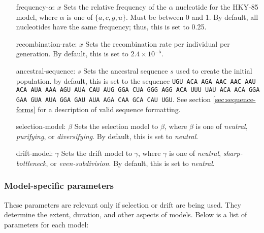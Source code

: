\documentclass{article}
\begin{document}
\begin{enumerate}
          \item[frequency-$\alpha$: $x$]
          Sets the relative frequency of the $\alpha$ nucleotide for the HKY-85
          model, where $\alpha$ is one of $\{a, c, g, u\}$. Must be between 0
          and 1. By default, all nucleotides have the same frequency; thus,
          this is set to 0.25.

          \item[recombination-rate: $x$]
          Sets the recombination rate per individual per generation. By default,
          this is set to $2.4 \times 10^{-5}$.

          \item[ancestral-sequence: $s$]
          Sets the ancestral sequence $s$ used to create the initial population.
          by default, this is set to the sequence {\tt UGU ACA AGA AAC AAC AAU
          ACA AUA AAA AGU AUA CAU AUG GGA CUA GGG AGG ACA UUU UAU ACA ACA GGA
          GAA GUA AUA GGA GAU AUA AGA CAA GCA CAU UGU}. See section
	  \ref{sec:sequence-forms} for a description of valid sequence
	  formatting.

          \item[selection-model: $\beta$]
          Sets the selection model to $\beta$, where $\beta$ is one of {\em
          neutral}, {\em purifying}, or {\em diversifying}. By default, this is
          set to {\em neutral}.

          \item[drift-model: $\gamma$]
          Sets the drift model to $\gamma$, where $\gamma$ is one of {\em
          neutral}, {\em sharp-bottleneck}, or {\em even-subdivision}. By
          default, this is set to {\em neutral}.
        \end{enumerate}

      \subsubsection{Model-specific parameters}
        \label{sec:model-directives}

        These parameters are relevant only if selection or drift are being used.
        They determine the extent, duration, and other aspects of models. Below
        is a list of parameters for each model:
\end{document}
